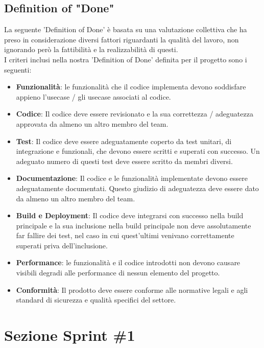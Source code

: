 \documentclass{article}
\begin{document}
\clearpage

\subsection{Definition of "Done"}
La seguente 'Definition of Done' è basata su una valutazione collettiva che ha preso in considerazione  diversi fattori riguardanti la qualità del lavoro, non ignorando però la fattibilità e la realizzabilità di questi.\\
I criteri inclusi nella nostra 'Definition of Done' definita per il progetto sono i seguenti:
\begin{itemize}
	\item \textbf{Funzionalità}: le funzionalità che il codice implementa devono soddisfare appieno l'usecase / gli usecase associati al codice.
    \item \textbf{Codice}: Il codice deve essere revisionato e la sua correttezza / adeguatezza approvata da almeno un altro membro del team.
    \item \textbf{Test}: Il codice deve essere adeguatamente coperto da test unitari, di integrazione e funzionali, che devono essere scritti e superati con successo. Un adeguato numero di questi test deve essere scritto da membri diversi.
    \item \textbf{Documentazione}: Il codice e le funzionalità implementate devono essere adeguatamente documentati. Questo giudizio di adeguatezza deve essere dato da almeno un altro membro del team.
    \item \textbf{Build e Deployment}: Il codice deve integrarsi con successo nella build principale e la sua inclusione nella build principale non deve assolutamente far fallire dei test, nel caso in cui quest'ultimi venivano correttamente superati priva dell'inclusione.
    \item \textbf{Performance}: le funzionalità e il codice introdotti non devono causare visibili degradi alle performance di nessun elemento del progetto.
    \item \textbf{Conformità}: Il prodotto deve essere conforme alle normative legali e agli standard di sicurezza e qualità specifici del settore.
\end{itemize}

\clearpage

\section{Sezione Sprint \#1}
\end{document}
